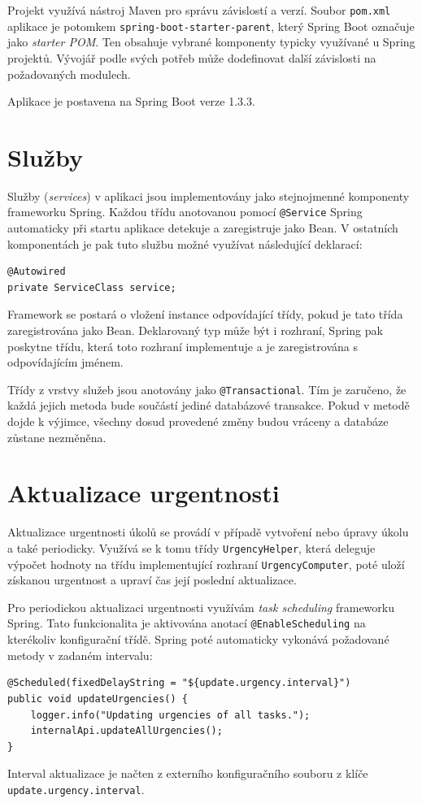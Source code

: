 \documentclass[thesis=B,czech]{FITthesis}[2012/06/26]
\begin{document}
		Projekt využívá nástroj Maven pro správu závislostí a verzí. Soubor \texttt{pom.xml} aplikace je potomkem \texttt{spring-boot-starter-parent}, který Spring Boot označuje jako \textit{starter POM}. Ten obsahuje vybrané komponenty typicky využívané u Spring projektů. Vývojář podle svých potřeb může dodefinovat další závislosti na požadovaných modulech.
		
		Aplikace je postavena na Spring Boot verze 1.3.3.
				
	\section{Služby}
		Služby (\textit{services}) v aplikaci jsou implementovány jako stejnojmenné komponenty frameworku Spring. Každou třídu anotovanou pomocí \texttt{@Service} Spring automaticky při startu aplikace detekuje a zaregistruje jako Bean. V ostatních komponentách je pak tuto službu možné využívat následující deklarací:
		\begin{Verbatim}
@Autowired
private ServiceClass service;
		\end{Verbatim}
		
		Framework se postará o vložení instance odpovídající třídy, pokud je tato třída zaregistrována jako Bean. Deklarovaný typ může být i rozhraní, Spring pak poskytne třídu, která toto rozhraní implementuje a je zaregistrována s odpovídajícím jménem.
		
		Třídy z vrstvy služeb jsou anotovány jako \texttt{@Transactional}. Tím je zaručeno, že každá jejich metoda bude součástí jediné databázové transakce. Pokud v metodě dojde k výjimce, všechny dosud provedené změny budou vráceny a databáze zůstane nezměněna.
	
	\section{Aktualizace urgentnosti}
		Aktualizace urgentnosti úkolů se provádí v případě vytvoření nebo úpravy úkolu a také periodicky. Využívá se k tomu třídy \texttt{UrgencyHelper}, která deleguje výpočet hodnoty na třídu implementující rozhraní \texttt{UrgencyComputer}, poté uloží získanou urgentnost a upraví čas její poslední aktualizace.
		
		Pro periodickou aktualizaci urgentnosti využívám \textit{task scheduling} frameworku Spring. Tato funkcionalita je aktivována anotací \texttt{@EnableScheduling} na kterékoliv konfigurační třídě. Spring poté automaticky vykonává požadované metody v zadaném intervalu:
		\begin{Verbatim}
@Scheduled(fixedDelayString = "${update.urgency.interval}")
public void updateUrgencies() {
	logger.info("Updating urgencies of all tasks.");
	internalApi.updateAllUrgencies();
}
		\end{Verbatim}
		Interval aktualizace je načten z externího konfiguračního souboru z klíče \texttt{update.urgency.interval}.
	
\end{document}
